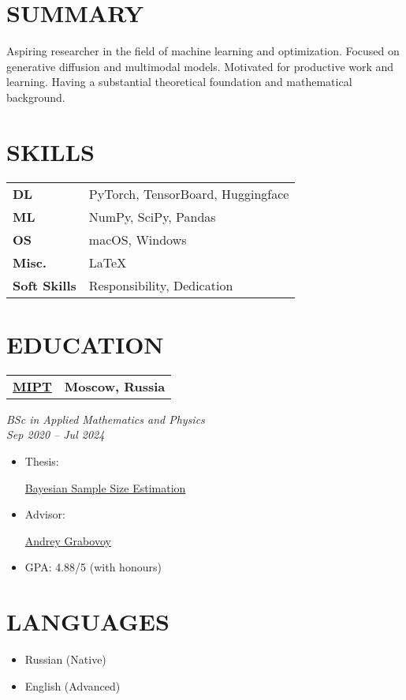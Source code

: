 \documentclass[11pt,a4paper]{moderncv}
\newcommand*{\educationentry}[4][0.5mm]{
    \begin{tabularx}{\textwidth}{LR}
        {\bfseries #3} & {\bfseries #4} \\
    \end{tabularx}
    {\itshape #2}
    \par\addvspace{#1}
}
\newcommand*{\scoreentry}[3][2.5mm]{
    {\bfseries #2} \\
    {\itshape #3}
    \par\addvspace{#1}
}
\begin{document}
\begin{minipage}[t]{0.35\textwidth}

\section{SUMMARY}
Aspiring researcher in the field of machine learning and optimization.  Focused on generative diffusion and multimodal models. Motivated for productive work and learning. Having a substantial theoretical foundation and mathematical background.

\section{SKILLS}
\begin{tabularx}{\textwidth}{>{\bfseries}l@{\hskip 3.5mm}L}
DL & PyTorch, TensorBoard, Huggingface \\
ML & NumPy, SciPy, Pandas \\
OS & macOS, Windows \\
Misc. & \LaTeX \\
Soft Skills & Responsibility, Dedication
\end{tabularx}

\section{EDUCATION}
\educationentry{BSc in Applied Mathematics and Physics\\Sep 2020 -- Jul 2024}{\href{https://mipt.ru}{MIPT}}{Moscow, Russia}
\begin{itemize}
\item Thesis: \par \href{https://github.com/intsystems/Kiselev-BS-Thesis}{Bayesian Sample Size Estimation}
\item Advisor: \par \href{https://andriygav.github.io}{Andrey Grabovoy}
\item GPA: 4.88/5 (with honours)
\end{itemize}


\section{LANGUAGES}
\begin{itemize}
    \item Russian (Native)
    \item English (Advanced)
\end{itemize}


\end{minipage}
\end{document}
